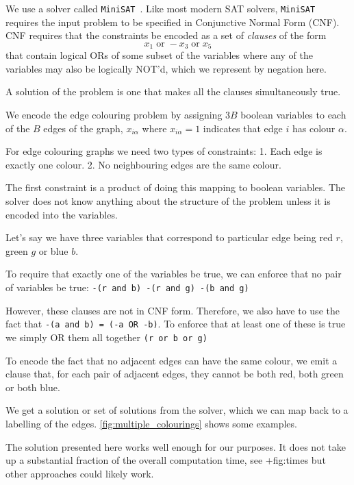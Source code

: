 We use a solver called \passthrough{\lstinline!MiniSAT!}~\autocite{imms-sat18}. Like most modern SAT solvers, \passthrough{\lstinline!MiniSAT!} requires the input problem to be specified in Conjunctive Normal Form (CNF). CNF requires that the constraints be encoded as a set of \emph{clauses} of the form \[x_1 \;\textrm{or}\; -x_3 \;\textrm{or}\; x_5\] that contain logical ORs of some subset of the variables where any of the variables may also be logically NOT'd, which we represent by negation here.

A solution of the problem is one that makes all the clauses simultaneously true.

We encode the edge colouring problem by assigning \(3B\) boolean variables to each of the \(B\) edges of the graph, \(x_{i\alpha}\) where \(x_{i\alpha} = 1\) indicates that edge \(i\) has colour \(\alpha\).

For edge colouring graphs we need two types of constraints: 1. Each edge is exactly one colour. 2. No neighbouring edges are the same colour.

The first constraint is a product of doing this mapping to boolean variables. The solver does not know anything about the structure of the problem unless it is encoded into the variables.

Let's say we have three variables that correspond to particular edge being red \(r\), green \(g\) or blue \(b\).

To require that exactly one of the variables be true, we can enforce that no pair of variables be true: \passthrough{\lstinline!-(r and b) -(r and g) -(b and g)!}

However, these clauses are not in CNF form. Therefore, we also have to use the fact that \passthrough{\lstinline!-(a and b) = (-a OR -b)!}. To enforce that at least one of these is true we simply OR them all together \passthrough{\lstinline!(r or b or g)!}

To encode the fact that no adjacent edges can have the same colour, we emit a clause that, for each pair of adjacent edges, they cannot be both red, both green or both blue.

We get a solution or set of solutions from the solver, which we can map back to a labelling of the edges. \cref{fig:multiple_colourings} shows some examples.

The solution presented here works well enough for our purposes. It does not take up a substantial fraction of the overall computation time, see +fig:times but other approaches could likely work.

